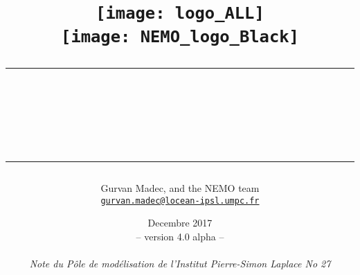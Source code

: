 \documentclass[a4paper, 11pt]{book}
\begin{document}


\title{
\vspace{-6.0cm}\texttt{[image: logo\_ALL]}				\\
\vspace{ 5.1cm}\texttt{[image: NEMO\_logo\_Black]}	\\
\vspace{ 1.4cm}\rule{345pt}{1.5pt}													\\
\vspace{0.45cm}{\Huge NEMO ocean engine}											\\
\rule{345pt}{1.5pt}
}

\author{
\Large Gurvan Madec, and the NEMO team					                                             \\
\texttt{\small\href{mailto:gurvan.madec@locean-ipsl.umpc.fr}{gurvan.madec@locean-ipsl.umpc.fr}}	\\
}

\date{
Decembre 2017																											\\
{\small  -- version 4.0 alpha --}																				\\
~																															\\
\textit{\small Note du P\^ole de mod\'{e}lisation de l'Institut Pierre-Simon Laplace No 27 }	\\
\vspace{0.45cm}{ ISSN No 1288-1619.}
}

\maketitle
\frontmatter



\dominitoc
\tableofcontents



\mainmatter












\end{document}
